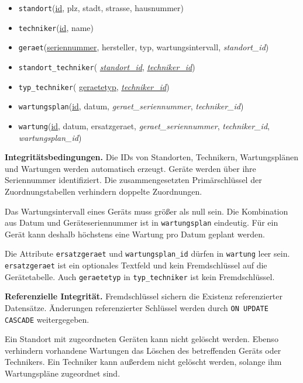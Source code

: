 \documentclass[11pt,a4paper]{article}
\begin{document}
\begin{itemize}[leftmargin=1.4em]
  \item \texttt{standort}(\underline{id}, plz, stadt,
        strasse, hausnummer)

  \item \texttt{techniker}(\underline{id}, name)

  \item \texttt{geraet}(\underline{seriennummer}, hersteller,
        typ, wartungsintervall, \emph{standort\_id})

  \item \texttt{standort\_techniker}(
        \underline{\emph{standort\_id}},
        \underline{\emph{techniker\_id}})

  \item \texttt{typ\_techniker}(
        \underline{geraetetyp},
        \underline{\emph{techniker\_id}})

  \item \texttt{wartungsplan}(\underline{id}, datum,
        \emph{geraet\_seriennummer}, \emph{techniker\_id})

  \item \texttt{wartung}(\underline{id}, datum,
        ersatzgeraet, \emph{geraet\_seriennummer},
        \emph{techniker\_id}, \emph{wartungsplan\_id})
\end{itemize}

\textbf{Integritätsbedingungen.}
Die IDs von Standorten, Technikern, Wartungsplänen und Wartungen
werden automatisch erzeugt. Geräte werden über ihre Seriennummer
identifiziert. Die zusammengesetzten Primärschlüssel der
Zuordnungstabellen verhindern doppelte Zuordnungen.

Das Wartungsintervall eines Geräts muss größer als null sein.
Die Kombination aus Datum und Geräteseriennummer ist in
\texttt{wartungsplan} eindeutig. Für ein Gerät kann deshalb
höchstens eine Wartung pro Datum geplant werden.

Die Attribute \texttt{ersatzgeraet} und
\texttt{wartungsplan\_id} dürfen in \texttt{wartung}
leer sein. \texttt{ersatzgeraet} ist ein optionales Textfeld
und kein Fremdschlüssel auf die Gerätetabelle.
Auch \texttt{geraetetyp} in \texttt{typ\_techniker}
ist kein Fremdschlüssel.

\textbf{Referenzielle Integrität.}
Fremdschlüssel sichern die Existenz referenzierter Datensätze.
Änderungen referenzierter Schlüssel werden durch
\texttt{ON UPDATE CASCADE} weitergegeben.

Ein Standort mit zugeordneten Geräten kann nicht gelöscht werden.
Ebenso verhindern vorhandene Wartungen das Löschen des betreffenden
Geräts oder Technikers. Ein Techniker kann außerdem nicht gelöscht
werden, solange ihm Wartungspläne zugeordnet sind.
\end{document}
